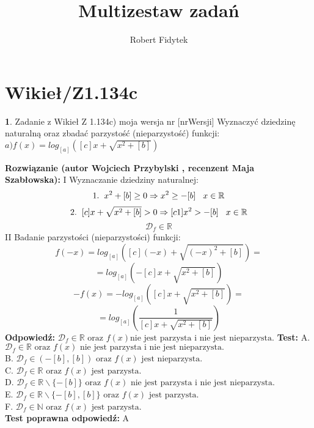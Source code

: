 \documentclass[12pt, a4paper]{article}
\title{Multizestaw zadań}
\author{Robert Fidytek}
\date{}
\theoremstyle{definition} %
\newtheorem{zad}{}
\newcommand{\kategoria}[1]{\section{#1}} %
\newcommand{\zadStart}[1]{\begin{zad}#1\newline} %
\newcommand{\zadStop}{\end{zad}}   %
\newcommand{\rozwStart}[2]{\noindent \textbf{Rozwiązanie (autor #1 , recenzent #2): }\newline} %
\newcommand{\rozwStop}{\newline}                                            %
\newcommand{\odpStart}{\noindent \textbf{Odpowiedź:}\newline}    %
\newcommand{\odpStop}{\newline}                                             %
\newcommand{\testStart}{\noindent \textbf{Test:}\newline} %
\newcommand{\testStop}{\newline} %
\newcommand{\kluczStart}{\noindent \textbf{Test poprawna odpowiedź:}\newline} %
\newcommand{\kluczStop}{\newline} %
\begin{document}
\maketitle


\kategoria{Wikieł/Z1.134c}
\zadStart{Zadanie z Wikieł Z 1.134c) moja wersja nr [nrWersji]}
Wyznaczyć dziedzinę naturalną oraz zbadać parzystość (nieparzystość) funkcji:\\
$a) f(x)=log_{[a]}([c]x+\sqrt{x^{2}+[b]})$
\zadStop
\rozwStart{Wojciech Przybylski}{Maja Szabłowska}
I Wyznaczanie dziedziny naturalnej:\\
$$1.\hspace{2mm}x^{2}+[b]\geq0 \Rightarrow x^{2}\geq-[b] \hspace{3mm} x\in\mathbb{R}$$
$$2.\hspace{2mm}[c]x+\sqrt{x^{2}+[b]}>0 \Rightarrow [c1]x^{2}>-[b]\hspace{3mm} x\in\mathbb{R}$$
$$\mathcal{D}_{f}\in\mathbb{R}$$
II Badanie parzystości (nieparzystości) funkcji:
$$f(-x)=log_{[a]}([c](-x)+\sqrt{(-x)^{2}+[b]})=$$
$$=log_{[a]}(-[c]x+\sqrt{x^{2}+[b]})$$
$$-f(x)=-log_{[a]}([c]x+\sqrt{x^{2}+[b]})=$$
$$=log_{[a]}(\frac{1}{[c]x+\sqrt{x^{2}+[b]}})$$
\rozwStop
\odpStart
$\mathcal{D}_{f}\in\mathbb{R} \mbox{ oraz } f(x)\mbox{nie jest parzysta i nie jest nieparzysta.}$ 
\odpStop
\testStart
A. $\mathcal{D}_{f}\in\mathbb{R} \mbox{ oraz } f(x)\mbox{ nie jest parzysta i nie jest nieparzysta.}$  \\
B. $\mathcal{D}_{f}\in (-[b],[b]) \mbox{ oraz } f(x)\mbox{ jest nieparzysta.}$ \\
C. $\mathcal{D}_{f}\in \mathbb{R} \mbox{ oraz } f(x)\mbox{ jest parzysta.}$ \\
D. $\mathcal{D}_{f}\in \mathbb{R}\backslash\{-[b]\} \mbox{ oraz } f(x)\mbox{ nie jest parzysta i nie jest nieparzysta.}$ \\
E. $\mathcal{D}_{f}\in \mathbb{R}{\backslash}\{-[b],[b]\} \mbox{ oraz } f(x)\mbox{ jest parzysta.}$ \\
F. $\mathcal{D}_{f}\in \mathbb{N} \mbox{ oraz } f(x)\mbox{ jest parzysta.}$ \\
\testStop
\kluczStart
A
\kluczStop
\end{document}
